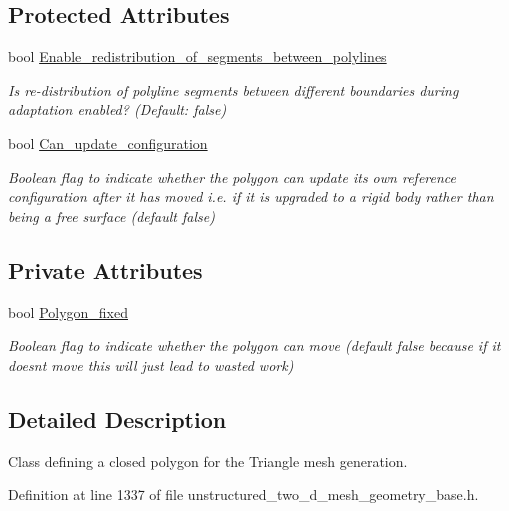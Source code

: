 \subsection*{Protected Attributes}
\begin{DoxyCompactItemize}
\item 
bool \hyperlink{classoomph_1_1TriangleMeshPolygon_ad5f0494a9cda7d7e122eacb0a6c2bd27}{Enable\+\_\+redistribution\+\_\+of\+\_\+segments\+\_\+between\+\_\+polylines}
\begin{DoxyCompactList}\small\item\em Is re-\/distribution of polyline segments between different boundaries during adaptation enabled? (Default\+: false) \end{DoxyCompactList}\item 
bool \hyperlink{classoomph_1_1TriangleMeshPolygon_a703de438e3b14d533433833b7d0aea1a}{Can\+\_\+update\+\_\+configuration}
\begin{DoxyCompactList}\small\item\em Boolean flag to indicate whether the polygon can update its own reference configuration after it has moved i.\+e. if it is upgraded to a rigid body rather than being a free surface (default false) \end{DoxyCompactList}\end{DoxyCompactItemize}
\subsection*{Private Attributes}
\begin{DoxyCompactItemize}
\item 
bool \hyperlink{classoomph_1_1TriangleMeshPolygon_a7f79fb03756524e23c8cc717c7c66f75}{Polygon\+\_\+fixed}
\begin{DoxyCompactList}\small\item\em Boolean flag to indicate whether the polygon can move (default false because if it doesn\textquotesingle{}t move this will just lead to wasted work) \end{DoxyCompactList}\end{DoxyCompactItemize}


\subsection{Detailed Description}
Class defining a closed polygon for the Triangle mesh generation. 

Definition at line 1337 of file unstructured\+\_\+two\+\_\+d\+\_\+mesh\+\_\+geometry\+\_\+base.\+h.



